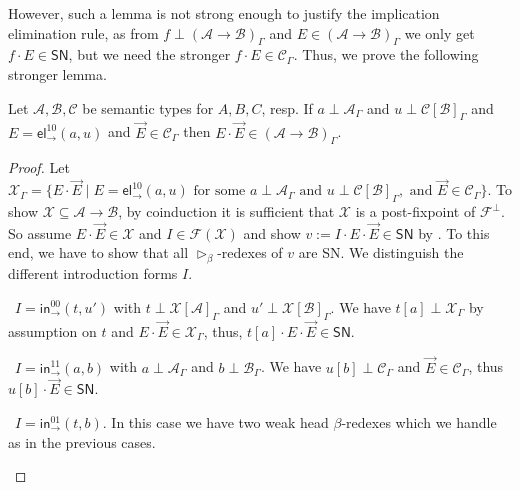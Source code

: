 \documentclass[a4paper,USenglish,cleveref, autoref, thm-restate]{lipics-v2019}
\newenvironment{caselist}{%
  \begin{list}{{\it Case}}{%
  }%
}{\end{list}%
}
\newcommand{\nextcase}{\item~}
\newcommand{\tin}{\ensuremath{\mathsf{in}}}
\newcommand{\inn}[2]{\ensuremath{\tin_{#1}^{#2}}}
\newcommand{\tel}{\mathsf{el}}
\newcommand{\el}[2]{\ensuremath{\tel_{#1}^{#2}}}
\newcommand{\contract}[1][]{\mapsto_{#1}}
\newcommand{\whd}[1][]{\rhd_{#1}}
\newcommand{\A}{\mathcal{A}}
\newcommand{\B}{\mathcal{B}}
\newcommand{\C}{\mathcal{C}}
\newcommand{\F}{\mathcal{F}}
\newcommand{\X}{\mathcal{X}}
\newcommand{\SN}{\mathsf{SN}}
\begin{document}
%
%
However, such a lemma
is not strong enough to justify the implication
elimination rule, as from $f \perp (\A \to \B)_\Gamma$ and $E \in (\A
\to \B)_\Gamma$ we only get $f \cdot E \in \SN$, but we need the
stronger $f \cdot E \in \C_\Gamma$.
Thus, we prove the following stronger lemma.

\begin{lemma}
  \label{lem:appprev}
  Let $\A,\B,\C$ be semantic types for $A,B,C$, resp.  If
  $a \perp \A_\Gamma$ and $u \perp \C[\B]_\Gamma$ and
  $E = \el\to{10}(a,u)$ and $\vec E \in \C_\Gamma$ then
  $E \cdot \vec E \in (\A \to \B)_\Gamma$.
\end{lemma}

\begin{proof}
  Let $\X_\Gamma = \{ E \cdot \vec E \mid E = \el\to{10}(a,u)
  \mbox{ for some } a \perp \A_\Gamma \mbox{ and } u \perp \C[\B]_\Gamma,
  \mbox{ and } \vec E \in \C_\Gamma \}$.
  To show $\X \subseteq \A \to \B$, by coinduction
  it is sufficient that $\X$ is a post-fixpoint of $\F^\perp$.  So
  assume $E \cdot \vec E \in \X$ and $I \in \F(\X)$ and show
  $v := I \cdot E \cdot \vec E \in \SN$
  by .  To this end, we have to show that all
  $\whd[\beta]$-redexes of $v$ are SN.
  We distinguish the different introduction forms $I$.
  \begin{caselist}

    \nextcase $I = \inn\to{00}(t,u')$ with
    $t \perp \X[\A]_\Gamma$ and
    $u' \perp \X[\B]_\Gamma$.
    We have
    $t[a] \perp \X_\Gamma$ by assumption on $t$ and
    $E \cdot \vec E \in \X_\Gamma$,
    thus, $t[a] \cdot E \cdot \vec E \in \SN$.

    \nextcase $I = \inn\to{11}(a,b)$ with $a \perp \A_\Gamma$ and
    $b \perp \B_\Gamma$.
    We have
    $u[b] \perp \C_\Gamma$ and $\vec E \in \C_\Gamma$,
    thus $u[b] \cdot \vec E \in \SN$.

    \nextcase $I = \inn\to{01}(t,b)$.  In this case we have two
      weak head $\beta$-redexes which we handle as in the
      previous cases.
  \popQED
  \end{caselist}
\end{proof}
\end{document}
